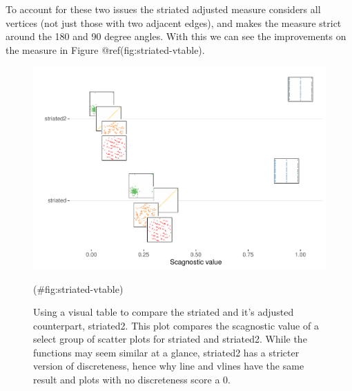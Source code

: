 To account for these two issues the striated adjusted measure considers
all vertices (not just those with two adjacent edges), and makes the
measure strict around the 180 and 90 degree angles. With this we can see
the improvements on the measure in Figure @ref(fig:striated-vtable).

\begin{Schunk}
\begin{figure}
\includegraphics[width=1\linewidth]{mason-lee-laa-cook_files/figure-latex/striated-vtable-1} \caption[Using a visual table to compare the striated and it's adjusted counterpart, striated2]{Using a visual table to compare the striated and it's adjusted counterpart, striated2. This plot compares the scagnostic value of a select group of scatter plots for striated and striated2. While the functions may seem similar at a glance, striated2 has a stricter version of discreteness, hence why line and vlines have the same result and plots with no discreteness score a 0.}(\#fig:striated-vtable)
\end{figure}
\end{Schunk}

